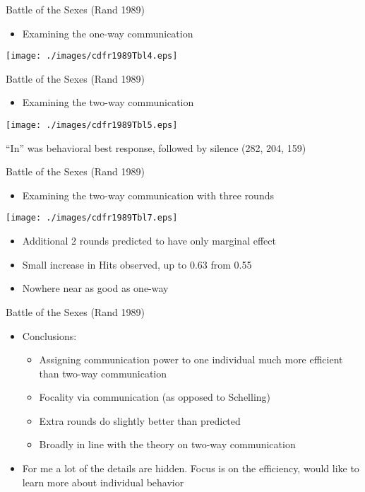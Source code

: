 \documentclass{beamer}
\begin{document}
\begin{frame}{Battle of the Sexes (Rand 1989)}
	\begin{itemize}
		\item Examining the one-way communication
	\end{itemize}
	\begin{center}
		\texttt{[image: ./images/cdfr1989Tbl4.eps]}
	\end{center}
\end{frame}
\begin{frame}{Battle of the Sexes (Rand 1989)}
	\begin{itemize}
		\item Examining the two-way communication
	\end{itemize}
	\begin{center}
		\texttt{[image: ./images/cdfr1989Tbl5.eps]}
	\end{center}
	``In'' was behavioral best response, followed by silence (282, 204, 159)
\end{frame}
\begin{frame}{Battle of the Sexes (Rand 1989)}
	\begin{itemize}
		\item Examining the two-way communication with three rounds
	\end{itemize}
	\begin{center}
		\texttt{[image: ./images/cdfr1989Tbl7.eps]}
	\end{center}
	\begin{itemize}
		\item Additional 2 rounds predicted to have only marginal effect
		\item Small increase in Hits observed, up to 0.63 from 0.55
		\item Nowhere near as good as one-way
	\end{itemize}
\end{frame}

\begin{frame}{Battle of the Sexes (Rand 1989)}
	\begin{itemize}
		\item Conclusions:
		\begin{itemize}
			\item Assigning communication power to one individual much more efficient than two-way communication
			\item Focality via communication (as opposed to Schelling)
			\item Extra rounds do slightly better than predicted
			\item Broadly in line with the theory on two-way communication
		\end{itemize}
		\item For me a lot of the details are hidden. Focus is on the efficiency, would like to learn more about individual behavior
	\end{itemize}
\end{frame}
\end{document}
